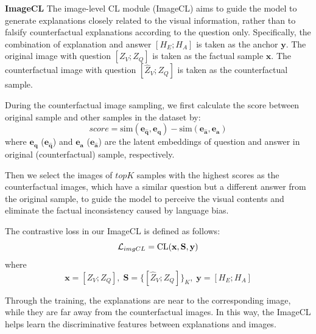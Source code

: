 \documentclass[letterpaper]{article} %
\begin{document}
\noindent
\textbf{ImageCL} The image-level CL module (ImageCL) aims to guide the model to generate explanations closely related to the visual information, rather than to falsify counterfactual explanations according to the question only. Specifically, the combination of explanation and answer $[{H_E;H_A}]$ is taken as the anchor $\mathbf{y}$. The original image with question $[{Z_V;Z_Q}]$ is taken as the factual sample $\mathbf{x}$. The counterfactual image with question $[{\hat{Z}_V;Z_Q}]$ is taken as the counterfactual sample. 

During the counterfactual image sampling, we first calculate the score between original sample and other samples in the dataset by:
\begin{equation*}\label{score}
	score = \text{sim}\left(\mathbf{e_{\hat{q}}}, \mathbf{e_{q}}  \right) - \text{sim}\left(\mathbf{e_{\hat{a}}}, \mathbf{e_{a}}  \right)
\end{equation*}
where $\mathbf{e_{q}}$ ($\mathbf{e_{\hat{q}}}$) and $\mathbf{e_{a}}$ ($\mathbf{e_{\hat{a}}}$) are the latent embeddings of question and answer in original (counterfactual) sample, respectively. 

Then we select the images of $topK$ samples with the highest scores as the counterfactual images, which have a similar question but a different answer from the original sample, to guide the model to perceive the visual contents and eliminate the factual inconsistency caused by language bias. 

The contrastive loss in our ImageCL is defined as follows:
\begin{equation}	
	\mathcal{L}_{imgCL} = \text{CL}(\mathbf{x},\mathbf{S},\mathbf{y})\\
\end{equation}
where
\begin{equation*}	
	\mathbf{x}=[{Z_V;Z_Q}], \; \mathbf{S}=\{[{\hat{Z}_V;Z_Q}]\}_{K}, \; \mathbf{y}=[{H_E;H_A}]
\end{equation*}

Through the training, the explanations are near to the corresponding image, while they are far away from the counterfactual images. In this way, the ImageCL helps learn the discriminative features between explanations and images.
\end{document}
